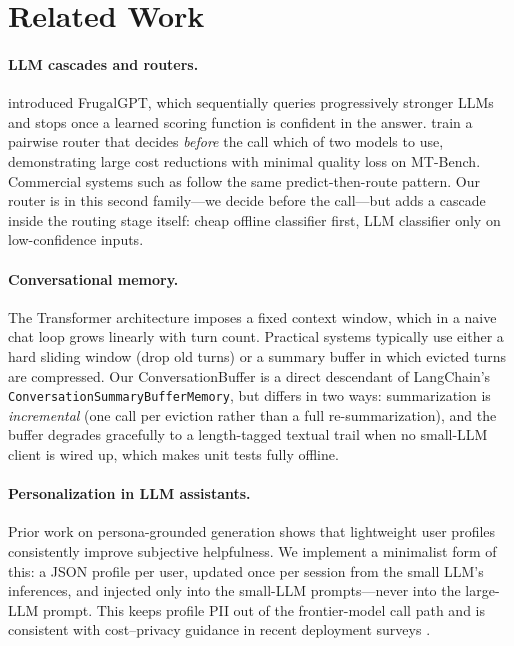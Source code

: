 \documentclass{article}
\begin{document}
\section{Related Work}
\label{sec:related}

\paragraph{LLM cascades and routers.}
\citet{chen_frugalgpt_2023} introduced FrugalGPT, which sequentially queries
progressively stronger LLMs and stops once a learned scoring function is
confident in the answer. \citet{ong_routellm_2024} train a pairwise router
that decides \emph{before} the call which of two models to use, demonstrating
large cost reductions with minimal quality loss on MT-Bench. Commercial
systems such as \citet{databricks_routing_2024} follow the same
predict-then-route pattern. Our router is in this second family---we decide
before the call---but adds a cascade inside the routing stage itself:
cheap offline classifier first, LLM classifier only on low-confidence inputs.

\paragraph{Conversational memory.}
The Transformer architecture \citep{vaswani_attention_2017} imposes a fixed
context window, which in a naive chat loop grows linearly with turn count.
Practical systems typically use either a hard sliding window (drop old turns)
or a summary buffer \citep{langchain_memory_2023, schlag_rmt_2023} in which
evicted turns are compressed. Our ConversationBuffer is a direct descendant
of LangChain's \texttt{ConversationSummaryBufferMemory}, but differs in two
ways: summarization is \emph{incremental} (one call per eviction rather than
a full re-summarization), and the buffer degrades gracefully to a
length-tagged textual trail when no small-LLM client is wired up, which makes
unit tests fully offline.

\paragraph{Personalization in LLM assistants.}
Prior work on persona-grounded generation
\citep{zhang_personachat_2018, salemi_lamp_2024} shows that lightweight user
profiles consistently improve subjective helpfulness. We implement a
minimalist form of this: a JSON profile per user, updated once per session
from the small LLM's inferences, and injected only into the small-LLM
prompts---never into the large-LLM prompt. This keeps profile PII out of the
frontier-model call path and is consistent with cost--privacy guidance in
recent deployment surveys \citep{bommasani_foundation_2021}.
\end{document}
